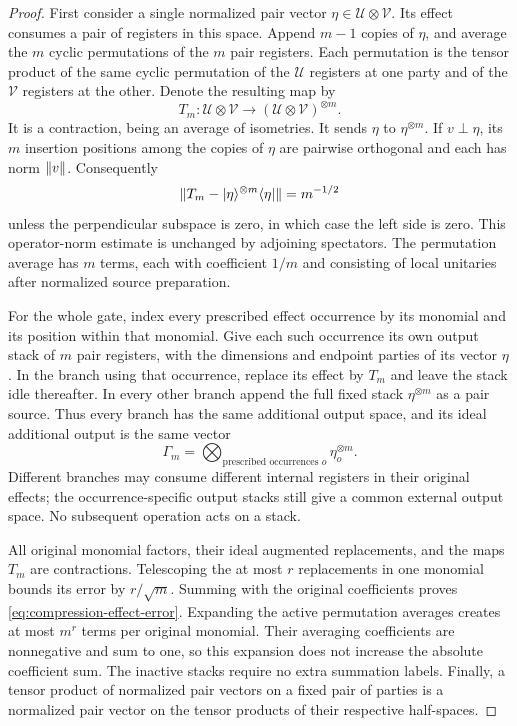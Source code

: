 \begin{proof}
First consider a single normalized pair vector
$\eta\in\mathcal U\otimes\mathcal V$.  Its effect consumes a pair of
registers in this space.  Append $m-1$ copies of $\eta$, and average the
$m$ cyclic permutations of the $m$ pair registers.  Each permutation is
the tensor product of the same cyclic permutation of the $\mathcal U$
registers at one party and of the $\mathcal V$ registers at the other.
Denote the resulting map by
\[
 T_m:\mathcal U\otimes\mathcal V
       \longrightarrow(\mathcal U\otimes\mathcal V)^{\otimes m}.
\]
It is a contraction, being an average of isometries.  It sends $\eta$ to
$\eta^{\otimes m}$.  If $v\perp\eta$, its $m$ insertion positions among
the copies of $\eta$ are pairwise orthogonal and each has norm
$\lVert v\rVert$.  Consequently
\begin{equation}
 \lVert T_m-|\eta\rangle^{\otimes m}\langle\eta|\rVert
       =m^{-1/2}
 \label{eq:compression-one-effect}
\end{equation}
unless the perpendicular subspace is zero, in which case the left side
is zero.  This operator-norm estimate is unchanged by adjoining
spectators.  The permutation average has $m$ terms, each with coefficient
$1/m$ and consisting of local unitaries after normalized source
preparation.

For the whole gate, index every prescribed effect occurrence by its
monomial and its position within that monomial.  Give each such
occurrence its own output stack of $m$ pair registers, with the dimensions
and endpoint parties of its vector $\eta$.  In the branch using that
occurrence, replace its effect by $T_m$ and leave the stack idle
thereafter.  In every other branch append the full fixed stack
$\eta^{\otimes m}$ as a pair source.  Thus every branch has the same
additional output space, and its ideal additional output is the same
vector
\[
 \Gamma_m=\bigotimes_{\text{prescribed occurrences }o}
                    \eta_o^{\otimes m}.
\]
Different branches may consume different internal registers in their
original effects; the occurrence-specific output stacks still give a
common external output space.  No subsequent operation acts on a stack.

All original monomial factors, their ideal augmented replacements, and
the maps $T_m$ are contractions.  Telescoping the at most $r$ replacements
in one monomial bounds its error by $r/\sqrt m$.  Summing with the
original coefficients proves
\eqref{eq:compression-effect-error}.  Expanding the active permutation
averages creates at most $m^r$ terms per original monomial.  Their
averaging coefficients are nonnegative and sum to one, so this expansion
does not increase the absolute coefficient sum.  The inactive stacks
require no extra summation labels.  Finally, a tensor product of
normalized pair vectors on a fixed pair of parties is a normalized pair
vector on the tensor products of their respective half-spaces.
\end{proof}

